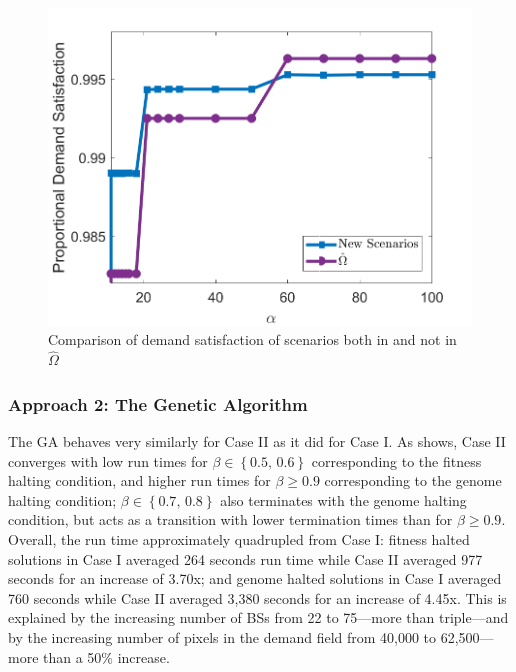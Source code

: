 \documentclass[12pt,dvipsnames]{report}
\begin{document}
\begin{figure}[htp]
	\centering
	\includegraphics[height=0.4\textheight]{Figures/CaseII_sDEPComparisonSatEval}
	\caption[Comparison of Case II demand satisfaction of scenarios both in and not in $\hat{\Omega}$]{Comparison of demand satisfaction of scenarios both in and not in $\hat{\Omega}$}
	\label{fig:CaseII_sDEPComparisonSatEval}
\end{figure}

\subsubsection{Approach 2: The Genetic Algorithm}

The GA behaves very similarly for Case II as it did for Case I.  As  shows, Case II converges with low run times for $\beta \in \left\{ 0.5,\, 0.6 \right\}$ corresponding to the fitness halting condition, and higher run times for $\beta \geq 0.9$ corresponding to the genome halting condition; $\beta \in \left\{ 0.7,\, 0.8 \right\}$ also terminates with the genome halting condition, but acts as a transition with lower termination times than for $\beta \geq 0.9$.  Overall, the run time approximately quadrupled from Case I: fitness halted solutions in Case I averaged 264 seconds run time while Case II averaged 977 seconds for an increase of 3.70x; and genome halted solutions in Case I averaged 760 seconds while Case II averaged 3,380 seconds for an increase of 4.45x.  This is explained by the increasing number of BSs from 22 to 75---more than triple---and by the increasing number of pixels in the demand field from 40,000 to 62,500---more than a 50\% increase.
\end{document}
